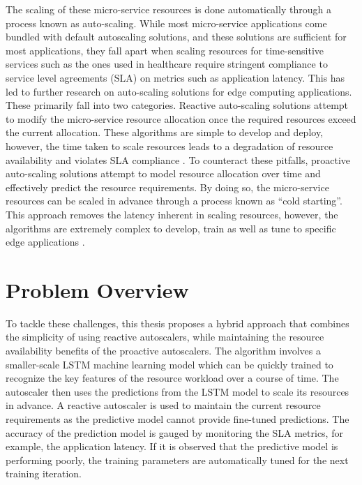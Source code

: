 The scaling of these micro-service resources is done automatically through a process known as auto-scaling. While most micro-service applications come bundled with default autoscaling solutions, and these solutions are sufficient for most applications, they fall apart when scaling resources for time-sensitive services such as the ones used in healthcare require stringent compliance to service level agreements (SLA) on metrics such as application latency. This has led to further research on auto-scaling solutions for edge computing applications. These primarily fall into two categories. Reactive auto-scaling solutions attempt to modify the micro-service resource allocation once the required resources exceed the current allocation. These algorithms are simple to develop and deploy, however, the time taken to scale resources leads to a degradation of resource availability and violates SLA compliance \cite{podolskiy2018iaas}. To counteract these pitfalls, proactive auto-scaling solutions attempt to model resource allocation over time and effectively predict the resource requirements. By doing so, the micro-service resources can be scaled in advance through a process known as ``cold starting''. This approach removes the latency inherent in scaling resources, however, the algorithms are extremely complex to develop, train as well as tune to specific edge applications \cite{straesser2022not}.

\section{Problem Overview}
\label{sec:problem-overview}

To tackle these challenges, this thesis proposes a hybrid approach that combines the simplicity of using reactive autoscalers, while maintaining the resource availability benefits of the proactive autoscalers. The algorithm involves a smaller-scale LSTM machine learning model which can be quickly trained to recognize the key features of the resource workload over a course of time. The autoscaler then uses the predictions from the LSTM model to scale its resources in advance. A reactive autoscaler is used to maintain the current resource requirements as the predictive model cannot provide fine-tuned predictions. The accuracy of the prediction model is gauged by monitoring the SLA metrics, for example, the application latency. If it is observed that the predictive model is performing poorly, the training parameters are automatically tuned for the next training iteration.\par

